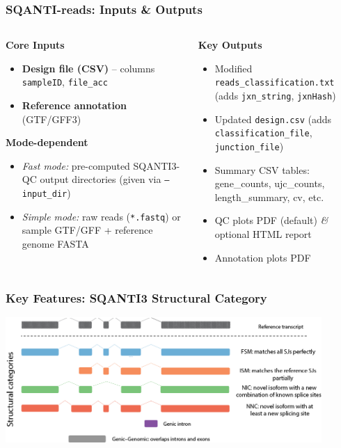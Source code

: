 \documentclass[aspectratio=169]{beamer}
\begin{document}
\begin{frame}
  \frametitle{SQANTI-reads: Inputs \& Outputs}
  \begin{columns}[T]
    \begin{column}{0.48\textwidth}
      \textbf{Core Inputs}
      \begin{itemize}
        \item \textbf{Design file (CSV)} – columns \texttt{sampleID}, \texttt{file\_acc}
        \item \textbf{Reference annotation} (GTF/GFF3)
      \end{itemize}
      \vspace{0.3em}
      \textbf{Mode-dependent}
      \begin{itemize}
        \item \emph{Fast mode:} pre-computed SQANTI3-QC output directories (given via \texttt{--input\_dir})
        \item \emph{Simple mode:} raw reads (\texttt{*.fastq}) or sample GTF/GFF + reference genome FASTA
      \end{itemize}
    \end{column}
    \begin{column}{0.48\textwidth}
      \textbf{Key Outputs}
      \begin{itemize}
        \item Modified \texttt{reads\_classification.txt} (adds \texttt{jxn\_string}, \texttt{jxnHash})
        \item Updated \texttt{design.csv} (adds \texttt{classification\_file}, \texttt{junction\_file})
        \item Summary CSV tables: gene\_counts, ujc\_counts, length\_summary, cv, etc.
        \item QC plots PDF (default) \emph{\&} optional HTML report
        \item Annotation plots PDF
      \end{itemize}
    \end{column}
  \end{columns}
\end{frame}

\begin{frame}
  \frametitle{Key Features: SQANTI3 Structural Category}
  \vspace{0.3cm}
  \centering
  \includegraphics[width=0.9\textwidth]{images/sqanti_structure_category.png}

\end{frame}
\end{document}

